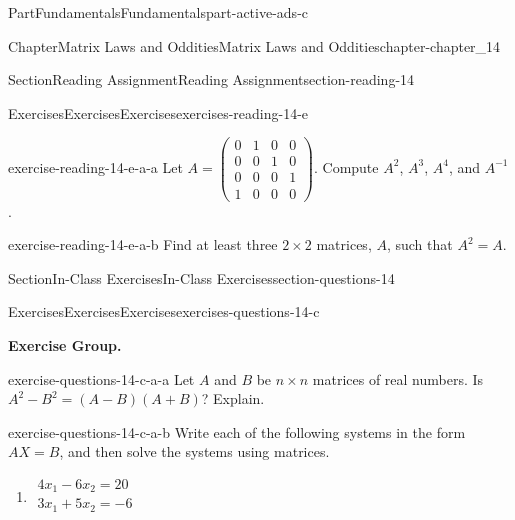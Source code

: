\documentclass[oneside,10pt,]{book}
\numberwithin{equation}{section}
\begin{document}
\begin{partptx}{Part}{Fundamentals}{}{Fundamentals}{}{}{part-active-ads-c}
\begin{chapterptx}{Chapter}{Matrix Laws and Oddities}{}{Matrix Laws and Oddities}{}{}{chapter-chapter_14}
\begin{sectionptx}{Section}{Reading Assignment}{}{Reading Assignment}{}{}{section-reading-14}
\begin{exercises-subsection-numberless}{Exercises}{Exercises}{}{Exercises}{}{}{exercises-reading-14-e}
\begin{exercisegroup}
\begin{divisionexerciseeg}{1}{}{}{exercise-reading-14-e-a-a}
Let \(A=\left(\begin{array}{cccc} 0 &1&0&0\\
0 &0&1&0\\
0&0&0&1\\
1 &0&0&0 \end{array}\right)\). Compute \(A^2\), \(A^3\), \(A^4\), and \(A^{-1}\).%
\end{divisionexerciseeg}%
\begin{divisionexerciseeg}{2}{}{}{exercise-reading-14-e-a-b}%
Find at least three \(2\times2\) matrices, \(A\), such that \(A^2=A\).%
\end{divisionexerciseeg}%
\end{exercisegroup}
\par\medskip\noindent
\end{exercises-subsection-numberless}
\end{sectionptx}
%
%
\typeout{************************************************}
\typeout{************************************************}
%
\begin{sectionptx}{Section}{In-Class Exercises}{}{In-Class Exercises}{}{}{section-questions-14}
%
%
%
\typeout{************************************************}
\typeout{************************************************}
%
\begin{exercises-subsection-numberless}{Exercises}{Exercises}{}{Exercises}{}{}{exercises-questions-14-c}
\par\medskip\noindent%
\textbf{Exercise Group.}\space\space%
\begin{exercisegroup}
\begin{divisionexerciseeg}{1}{}{}{exercise-questions-14-c-a-a}%
Let \(A\) and \(B\) be \(n\times n\) matrices of real numbers. Is \(A^2-B^2= (A-B)(A+B)\)?  Explain.%
\end{divisionexerciseeg}%
\begin{divisionexerciseeg}{2}{}{}{exercise-questions-14-c-a-b}%
Write each of the following systems in the form \(A X = B\), and then solve the systems using matrices.%
\par
%
\begin{multicols}{2}
\begin{enumerate}[label=(\alph*)]
\item{}\(\displaystyle \begin{array}{c}4x_1-6x_2=20\\
3x_1+5x_2= -6\\
\end{array}\)%

\end{enumerate}
\end{multicols}
\end{divisionexerciseeg}
\end{exercisegroup}
\end{exercises-subsection-numberless}
\end{sectionptx}
\end{chapterptx}
\end{partptx}
\end{document}
